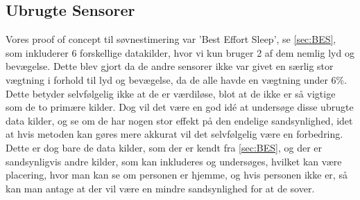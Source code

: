 \subsection{Ubrugte Sensorer}
Vores proof of concept til søvnestimering var 'Best Effort Sleep', se \cref{sec:BES}, som inkluderer 6 forskellige datakilder, hvor vi kun bruger 2 af dem nemlig lyd og bevægelse. 
Dette blev gjort da de andre sensorer ikke var givet en særlig stor vægtning i forhold til lyd og bevægelse, da de alle havde en vægtning under 6\%. 
Dette betyder selvfølgelig ikke at de er værdiløse, blot at de ikke er så vigtige som de to primære kilder.
Dog vil det være en god idé at undersøge disse ubrugte data kilder, og se om de har nogen stor effekt på den endelige sandsynlighed, idet at hvis metoden kan gøres mere akkurat vil det selvfølgelig være en forbedring. 
Dette er dog bare de data kilder, som der er kendt fra \cref{sec:BES}, og der er sandsynligvis andre kilder, som kan inkluderes og undersøges, hvilket kan være placering, hvor man kan se om personen er hjemme, og hvis personen ikke er, så kan man antage at der vil være en mindre sandsynlighed for at de sover. 
